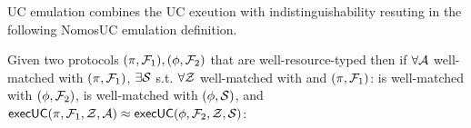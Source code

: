UC emulation combines the UC exeution with indistinguishability resuting in the following NomosUC emulation definition.
\begin{definition}[Emulation]\label{def:emulation}
Given two protocols $(\pi, \F_1), (\phi, \F_2)$ that are well-resource-typed then if $\forall \A$ well-matched with $(\pi, \F_1)$, $\exists \Sim$ s.t. $\forall \Z$ well-matched with \A and $(\pi, \F_1)$: \Sim is well-matched with $(\phi, \F_2)$, \Z is well-matched with $(\phi, \Sim)$, and $\msf{execUC}(\pi, \F_1, \Z, \A) \approx \msf{execUC}(\phi, \F_2, \Z, \Sim)$:

\begin{mathpar}
\footnotesize
\end{mathpar}
\end{definition}
